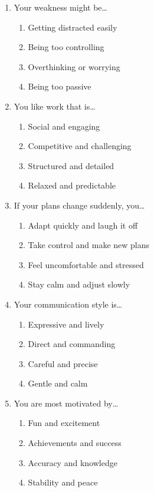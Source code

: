 \documentclass[12pt]{article}
\begin{document}
\begin{enumerate}[label=\textbf{Q\arabic*.}]
\item Your weakness might be…
\begin{enumerate}[label=(\Alph*)]
\item Getting distracted easily
\item Being too controlling
\item Overthinking or worrying
\item Being too passive
\end{enumerate}

\item You like work that is…
\begin{enumerate}[label=(\Alph*)]
\item Social and engaging
\item Competitive and challenging
\item Structured and detailed
\item Relaxed and predictable
\end{enumerate}

\item If your plans change suddenly, you…
\begin{enumerate}[label=(\Alph*)]
\item Adapt quickly and laugh it off
\item Take control and make new plans
\item Feel uncomfortable and stressed
\item Stay calm and adjust slowly
\end{enumerate}

\item Your communication style is…
\begin{enumerate}[label=(\Alph*)]
\item Expressive and lively
\item Direct and commanding
\item Careful and precise
\item Gentle and calm
\end{enumerate}

\item You are most motivated by…
\begin{enumerate}[label=(\Alph*)]
\item Fun and excitement
\item Achievements and success
\item Accuracy and knowledge
\item Stability and peace
\end{enumerate}


\end{enumerate}
\end{document}
